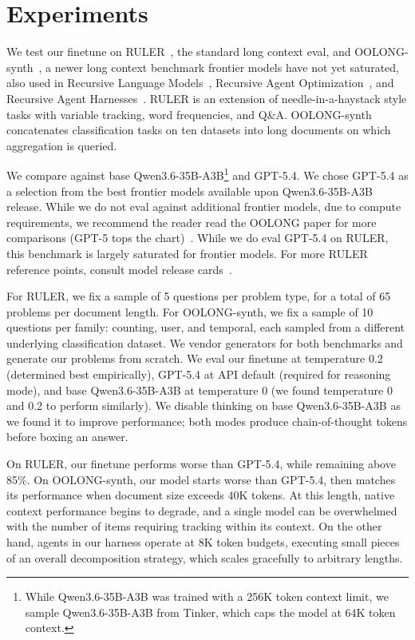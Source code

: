 \section{Experiments}
\label{experiments}

We test our finetune on RULER~\citep{hsieh2024ruler}, the standard long context eval, and OOLONG-synth~\citep{bertsch2025oolong}, a newer long context benchmark frontier models have not yet saturated, also used in Recursive Language Models~\citep{zhang2025rlm}, Recursive Agent Optimization~\citep{gandhi2026rao}, and Recursive Agent Harnesses~\citep{lumer2026rah}. RULER is an extension of needle-in-a-haystack style tasks with variable tracking, word frequencies, and Q\&A. OOLONG-synth concatenates classification tasks on ten datasets into long documents on which aggregation is queried.

We compare against base Qwen3.6-35B-A3B\footnote{While Qwen3.6-35B-A3B was trained with a 256K token context limit, we sample Qwen3.6-35B-A3B from Tinker, which caps the model at 64K token context.} and GPT-5.4. We chose GPT-5.4 as a selection from the best frontier models available upon Qwen3.6-35B-A3B release. While we do not eval against additional frontier models, due to compute requirements, we recommend the reader read the OOLONG paper for more comparisons (GPT-5 tops the chart)~\citep{bertsch2025oolong}. While we do eval GPT-5.4 on RULER, this benchmark is largely saturated for frontier models. For more RULER reference points, consult model release cards~\citep{nvidia2025nemotron3,glm5team2026glm5,lai2026msa,zhu2026pokeeisaac,dangel2026subq}.

For RULER, we fix a sample of 5 questions per problem type, for a total of 65 problems per document length. For OOLONG-synth, we fix a sample of 10 questions per family: counting, user, and temporal, each sampled from a different underlying classification dataset. We vendor generators for both benchmarks and generate our problems from scratch. We eval our finetune at temperature 0.2 (determined best empirically), GPT-5.4 at API default (required for reasoning mode), and base Qwen3.6-35B-A3B at temperature 0 (we found temperature 0 and 0.2 to perform similarly). We disable thinking on base Qwen3.6-35B-A3B as we found it to improve performance; both modes produce chain-of-thought tokens before boxing an answer.

On RULER, our finetune performs worse than GPT-5.4, while remaining above 85\%. On OOLONG-synth, our model starts worse than GPT-5.4, then matches its performance when document size exceeds 40K tokens. At this length, native context performance begins to degrade, and a single model can be overwhelmed with the number of items requiring tracking within its context. On the other hand, agents in our harness operate at 8K token budgets, executing small pieces of an overall decomposition strategy, which scales gracefully to arbitrary lengths.

